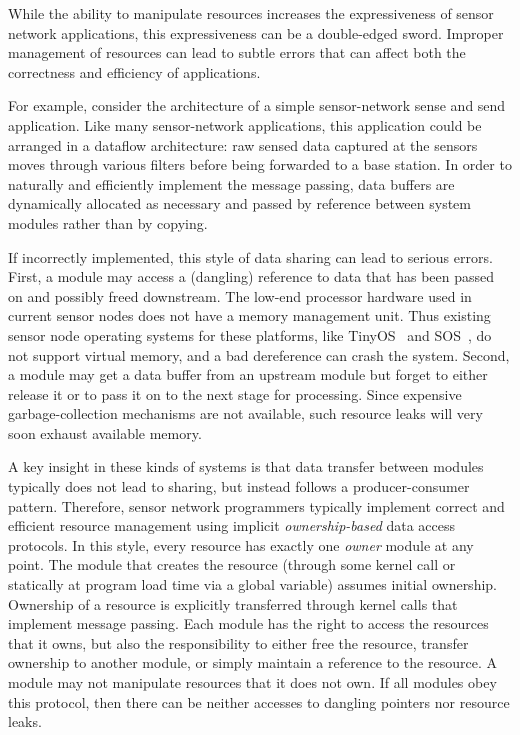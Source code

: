 While the ability to manipulate resources increases the expressiveness
of sensor network applications, this expressiveness can be a
double-edged sword.  Improper management of resources can lead to
subtle errors that can affect both the correctness and efficiency of
applications.

For example, consider the architecture of a simple sensor-network
sense and send application.
Like many sensor-network applications, this application could be
arranged in a dataflow architecture:  raw sensed data captured at the
sensors moves through various filters
before being forwarded to a base station.
In order to naturally and efficiently implement the message passing,
data buffers are dynamically allocated as necessary and passed by
reference between system modules rather than by copying.

If incorrectly implemented, this style of data sharing can lead to
serious errors.  First, a module may access a (dangling) reference to
data that has been passed on and possibly freed downstream. 
%
The low-end processor hardware used in current sensor nodes does not
have a memory management unit.  Thus existing sensor node operating
systems for these platforms, like TinyOS~\cite{TinyOS} and
SOS~\cite{sos}, do not support virtual memory, and a bad dereference
can crash the system. 
%
Second, a module may get a data buffer from an upstream module but
forget to either release it or to pass it on to the next stage for
processing.  Since expensive garbage-collection mechanisms are not
available, such resource leaks will very soon exhaust available
memory.


A key insight in these kinds of systems is that data transfer between
modules typically does not lead to sharing, but instead follows a
producer-consumer pattern.  Therefore, sensor network programmers
typically implement correct and efficient resource management using
implicit {\em ownership-based} data access protocols.  In this style,
every resource has exactly one {\em owner} module at any point.  The
module that creates the resource (through some kernel call or statically
at program load time via a global variable) assumes initial ownership.
Ownership of a resource is explicitly transferred through kernel calls
that implement message passing.  
%
%
Each module has the right to access the resources that it owns, but
also the responsibility to either free the resource, transfer
ownership to another module, or simply maintain a reference to the
resource.  
%
A module may not manipulate resources that it does not own.  If all
modules obey this protocol, then there can be neither accesses to
dangling pointers nor resource leaks.



